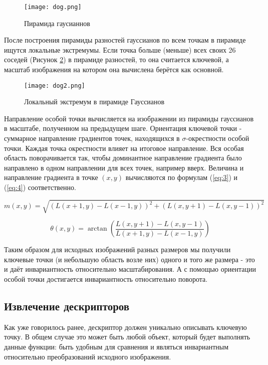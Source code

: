\begin{figure}[h]
    \centering
    \texttt{[image: dog.png]}
    \caption{Пирамида гаусианнов}
    \label{fig:dog1}
\end{figure}

После построения пирамиды разностей гауссианов по всем точкам в пирамиде ищутся локальные экстремумы. Если точка больше (меньше) всех своих 26 соседей (Рисунок \ref{fig:dog2}) в пирамиде разностей, то она считается ключевой, а масштаб изображения на котором она вычислена берётся как основной.

\begin{figure}[h]
    \centering
    \texttt{[image: dog2.png]}
    \caption{Локальный экстремум в пирамиде Гауссианов}
    \label{fig:dog2}
\end{figure}

Направление особой точки вычисляется на изображении из пирамиды гауссианов в масштабе, полученном на предыдущем шаге. Ориентация ключевой точки - суммарное направление градиентов точек, находящихся в  $\sigma$-окрестности особой точки. Каждая точка окрестности влияет на итоговое направление. Вся особая область поворачивается так, чтобы доминантное направление градиента было направлено в одном направлении для всех точек, например вверх. Величина и направление градиента в точке $(x,y)$ вычисляются по формулам (\ref{eq:3}) и (\ref{eq:4}) соответственно.

\begin{equation} \label{eq:3}
    m(x,y)=\sqrt{(L(x+1,y) - L(x-1,y))^2 + (L(x,y+1) - L(x,y-1))^2}
\end{equation}

\begin{equation} \label{eq:4}
    \theta(x,y)=\arctan{\left(\frac{L(x,y+1) - L(x,y-1)}{L(x+1,y) - L(x-1,y)}\right)}
\end{equation}

Таким образом для исходных изображений разных размеров мы получили ключевые точки (и небольшую область возле них) одного и того же размера - это и даёт инвариантность относительно масштабирования. А с помощью ориентации особой точки достигается инвариантность относительно поворота.

\subsection{Извлечение дескрипторов}

Как уже говорилось ранее, дескриптор должен уникально описывать ключевую точку. В общем случае это может быть любой объект, который будет выполнять данные функции: быть удобным для сравнения и являться инвариантным относительно преобразований исходного изображения.


